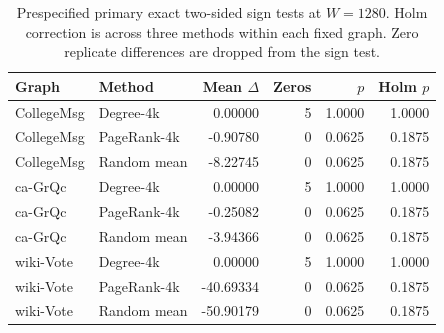 \begin{table}[htbp]
\caption{Prespecified primary exact two-sided sign tests at $W=1280$. Holm correction is across three methods within each fixed graph. Zero replicate differences are dropped from the sign test.}\label{tab:tests}
\begin{tabular}{llrrrr}
\toprule
Graph & Method & Mean $\Delta$ & Zeros & $p$ & Holm $p$ \\
\midrule
CollegeMsg & Degree-4k & 0.00000 & 5 & 1.0000 & 1.0000 \\
CollegeMsg & PageRank-4k & -0.90780 & 0 & 0.0625 & 0.1875 \\
CollegeMsg & Random mean & -8.22745 & 0 & 0.0625 & 0.1875 \\
ca-GrQc & Degree-4k & 0.00000 & 5 & 1.0000 & 1.0000 \\
ca-GrQc & PageRank-4k & -0.25082 & 0 & 0.0625 & 0.1875 \\
ca-GrQc & Random mean & -3.94366 & 0 & 0.0625 & 0.1875 \\
wiki-Vote & Degree-4k & 0.00000 & 5 & 1.0000 & 1.0000 \\
wiki-Vote & PageRank-4k & -40.69334 & 0 & 0.0625 & 0.1875 \\
wiki-Vote & Random mean & -50.90179 & 0 & 0.0625 & 0.1875 \\
\bottomrule
\end{tabular}
\end{table}

